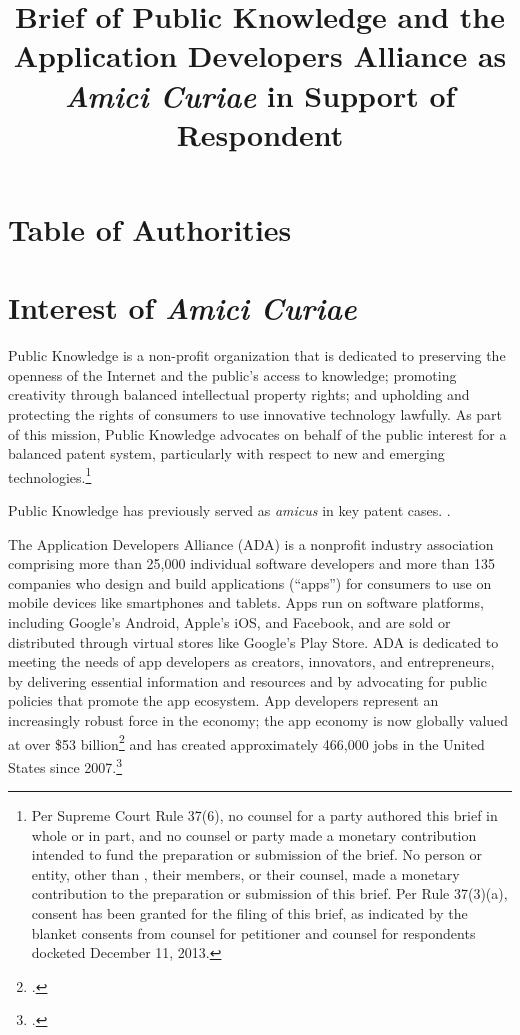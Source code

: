 \documentclass{scotus}
\title{Brief of Public Knowledge and the Application Developers Alliance as
\protect\\\emph{Amici Curiae} in Support of Respondent}
\begin{document}
\maketitle

\romanpagenumbers
\tableofcontents

\part{Table of Authorities}

\tableofauthorities

\clearpage
\arabicpagenumbers

\part{Interest of \emph{Amici Curiae}}

Public Knowledge is a non-profit organization that is dedicated to preserving
the openness of the Internet and the public's access to knowledge; promoting
creativity through balanced intellectual property rights; and upholding and
protecting the rights of consumers to use innovative technology lawfully. As
part of this mission, Public Knowledge advocates on behalf of the public
interest for a balanced patent system, particularly with respect to new and
emerging technologies.\footnote{Per Supreme Court Rule 37(6), no counsel for a
party authored this brief in whole or in part, and no counsel or party made a
monetary contribution intended to fund the preparation or submission of the
brief. No person or entity, other than \amici, their members, or their counsel,
made a monetary contribution to the preparation or submission of this brief. Per
Rule 37(3)(a), consent has been granted for the filing of this brief, as
indicated by the blanket consents from counsel for petitioner and counsel for
respondents docketed December 11, 2013.}

Public Knowledge has previously served as \emph{amicus} in key patent cases.
.

The Application Developers Alliance (ADA) is a nonprofit industry association
comprising more than 25,000 individual software developers and more than 135
companies who design and build applications (“apps”) for consumers to use on
mobile devices like smartphones and tablets. Apps run on software platforms,
including Google’s Android, Apple’s iOS, and Facebook, and are sold or
distributed through virtual stores like Google’s Play Store. ADA is dedicated to
meeting the needs of app developers as creators, innovators, and entrepreneurs,
by delivering essential information and resources and by advocating for public
policies that promote the app ecosystem. App developers represent an
increasingly robust force in the economy; the app economy is now globally valued
at over \$53 billion\footnote{.} and has created approximately
466,000 jobs in the United States since 2007.\footnote{.}
\end{document}
